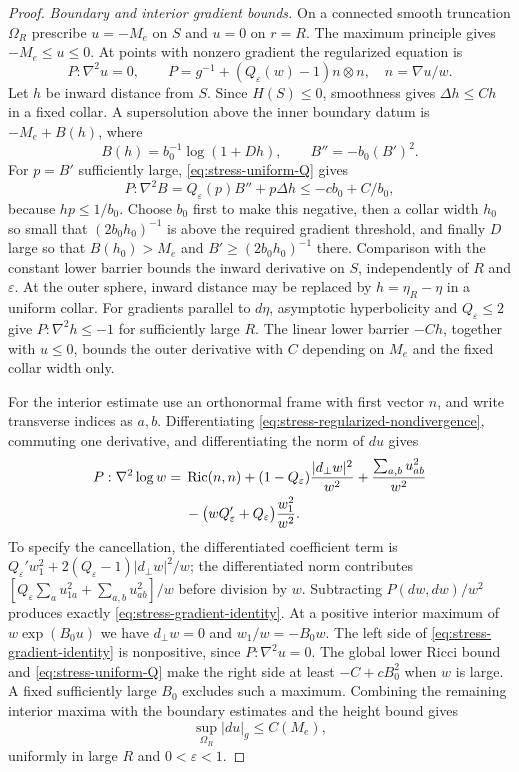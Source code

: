 \begin{proof}
\emph{Boundary and interior gradient bounds.}
On a connected smooth truncation $\Omega_R$ prescribe $u=-M_e$ on $S$
and $u=0$ on $r=R$.  The maximum principle gives $-M_e\le u\le0$.
At points with nonzero gradient the regularized equation is
\begin{equation}
 P:\nabla^2u=0,\qquad
 P=g^{-1}+(Q_\varepsilon(w)-1)n\otimes n,
 \quad n=\nabla u/w.
 \label{eq:stress-regularized-nondivergence}
\end{equation}
Let $h$ be inward distance from $S$.  Since $H(S)\le0$, smoothness
gives $\Delta h\le C h$ in a fixed collar.  A supersolution above the
inner boundary datum is $-M_e+B(h)$, where
\[
 B(h)=b_0^{-1}\log(1+Dh),\qquad B''=-b_0(B')^2.
\]
For $p=B'$ sufficiently large, \eqref{eq:stress-uniform-Q} gives
\[
 P:\nabla^2B=Q_\varepsilon(p)B''+p\Delta h
 \le-cb_0+C/b_0,
\]
because $hp\le1/b_0$.  Choose $b_0$ first to make this negative,
then a collar width $h_0$ so small that
$(2b_0h_0)^{-1}$ is above the required gradient threshold, and finally
$D$ large so that $B(h_0)>M_e$ and $B'\ge(2b_0h_0)^{-1}$ there.
Comparison with the constant lower barrier bounds the inward derivative
on $S$, independently of $R$ and $\varepsilon$.
At the outer sphere, inward distance may be replaced by
$h=\eta_R-\eta$ in a uniform collar.  For gradients parallel to
$d\eta$, asymptotic hyperbolicity and $Q_\varepsilon\le2$ give
$P:\nabla^2h\le-1$ for sufficiently large $R$.  The linear lower
barrier $-C h$, together with $u\le0$, bounds the outer derivative
with $C$ depending on $M_e$ and the fixed collar width only.

For the interior estimate use an orthonormal frame with first vector
$n$, and write transverse indices as $a,b$.  Differentiating
\eqref{eq:stress-regularized-nondivergence}, commuting one derivative,
and differentiating the norm of $du$ gives
\begin{align}
 P:\nabla^2\log w
 ={}&\operatorname{Ric}(n,n)
 +(1-Q_\varepsilon)\frac{|d_\perp w|^2}{w^2}
 +\frac{\sum_{a,b}u_{ab}^2}{w^2} \notag\\
 &-\big(wQ_\varepsilon'+Q_\varepsilon\big)\frac{w_1^2}{w^2}.
 \label{eq:stress-gradient-identity}
\end{align}
To specify the cancellation, the differentiated coefficient term is
$Q_\varepsilon'w_1^2+2(Q_\varepsilon-1)|d_\perp w|^2/w$;
the differentiated norm contributes
$[Q_\varepsilon\sum_a u_{1a}^2+\sum_{a,b}u_{ab}^2]/w$ before
division by $w$.  Subtracting $P(dw,dw)/w^2$ produces exactly
\eqref{eq:stress-gradient-identity}.
At a positive interior maximum of $w\exp(B_0u)$ we have
$d_\perp w=0$ and $w_1/w=-B_0w$.  The left side of
\eqref{eq:stress-gradient-identity} is nonpositive, since
$P:\nabla^2u=0$.  The global lower Ricci bound and
\eqref{eq:stress-uniform-Q} make the right side at least
$-C+cB_0^2$ when $w$ is large.  A fixed sufficiently large $B_0$
excludes such a maximum.  Combining the remaining interior maxima
with the boundary estimates and the height bound gives
\begin{equation}
 \sup_{\Omega_R}|du|_g\le C(M_e),
 \label{eq:stress-global-gradient-bound}
\end{equation}
uniformly in large $R$ and $0<\varepsilon<1$.


\end{proof}

